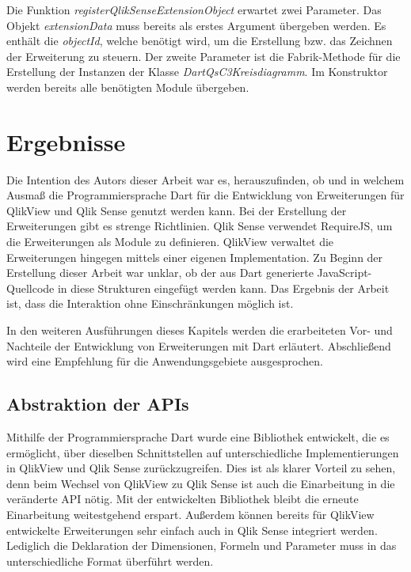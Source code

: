 Die Funktion \textit{registerQlikSenseExtensionObject} erwartet zwei Parameter. Das Objekt \textit{extension\-Data} muss bereits als erstes Argument übergeben werden. Es enthält die \textit{objectId}, welche benötigt wird, um die Erstellung bzw. das Zeichnen der Erweiterung zu steuern. Der zweite Parameter ist die Fabrik-Methode für die Erstellung der Instanzen der Klasse \textit{DartQsC3Kreisdiagramm}. Im Konstruktor werden bereits alle benötigten Module übergeben.







\section{Ergebnisse}
\label{lab:Ergebnisse} 

Die Intention des Autors dieser Arbeit war es, herauszufinden, ob und in welchem Ausmaß die Programmiersprache Dart für die Entwicklung von Erweiterungen für QlikView und Qlik Sense genutzt werden kann. Bei der Erstellung der Erweiterungen gibt es strenge Richtlinien. Qlik Sense verwendet RequireJS, um die Erweiterungen als Module zu definieren. QlikView verwaltet die Erweiterungen hingegen mittels einer eigenen Implementation. Zu Beginn der Erstellung dieser Arbeit war unklar, ob der aus Dart generierte JavaScript-Quellcode in diese Strukturen eingefügt werden kann. Das Ergebnis der Arbeit ist, dass die Interaktion ohne Einschränkungen möglich ist.

In den weiteren Ausführungen dieses Kapitels werden die erarbeiteten Vor- und Nachteile der Entwicklung von Erweiterungen mit Dart erläutert. Abschließend wird eine Empfehlung für die Anwendungsgebiete ausgesprochen.


\subsection{Abstraktion der APIs}


Mithilfe der Programmiersprache Dart wurde eine Bibliothek entwickelt, die es ermöglicht, über dieselben Schnittstellen auf unterschiedliche Implementierungen in QlikView und Qlik Sense zurückzugreifen. Dies ist als klarer Vorteil zu sehen, denn beim Wechsel von QlikView zu Qlik Sense ist auch die Einarbeitung in die veränderte API nötig. Mit der entwickelten Bibliothek bleibt die erneute Einarbeitung weitestgehend erspart. Außerdem können bereits für QlikView entwickelte Erweiterungen sehr einfach auch in Qlik Sense integriert werden. Lediglich die Deklaration der Dimensionen, Formeln und Parameter muss in das unterschiedliche Format überführt werden.

